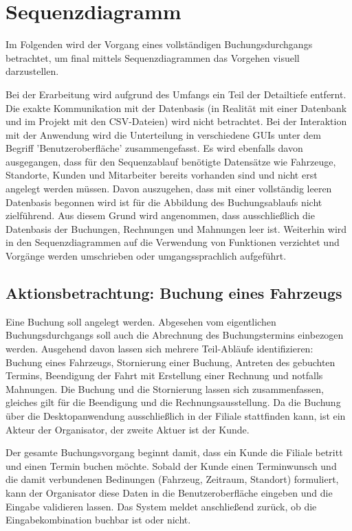 \chapter{Sequenzdiagramm}

Im Folgenden wird der Vorgang eines vollständigen Buchungsdurchgangs betrachtet, um final mittels Sequenzdiagrammen das Vorgehen visuell darzustellen. 

Bei der Erarbeitung wird aufgrund des Umfangs ein Teil der Detailtiefe entfernt. Die exakte Kommunikation mit der Datenbasis (in Realität mit einer Datenbank und im Projekt mit den CSV-Dateien) wird nicht betrachtet. Bei der Interaktion mit der Anwendung wird die Unterteilung in verschiedene GUIs unter dem Begriff 'Benutzeroberfläche' zusammengefasst. Es wird ebenfalls davon ausgegangen, dass für den Sequenzablauf benötigte Datensätze wie Fahrzeuge, Standorte, Kunden und Mitarbeiter bereits vorhanden sind und nicht erst angelegt werden müssen. Davon auszugehen, dass mit einer vollständig leeren Datenbasis begonnen wird ist für die Abbildung des Buchungsablaufs nicht zielführend. Aus diesem Grund wird angenommen, dass ausschließlich die Datenbasis der Buchungen, Rechnungen und Mahnungen leer ist. Weiterhin wird in den Sequenzdiagrammen auf die Verwendung von Funktionen verzichtet und Vorgänge werden umschrieben oder umgangssprachlich aufgeführt. 

\section{Aktionsbetrachtung: Buchung eines Fahrzeugs}

Eine Buchung soll angelegt werden. Abgesehen vom eigentlichen Buchungsdurchgangs soll auch die Abrechnung des Buchungstermins einbezogen werden. Ausgehend davon lassen sich mehrere Teil-Abläufe identifizieren: Buchung eines Fahrzeugs, Stornierung einer Buchung, Antreten des gebuchten Termins, Beendigung der Fahrt mit Erstellung einer Rechnung und notfalls Mahnungen. Die Buchung und die Stornierung lassen sich zusammenfassen, gleiches gilt für die Beendigung und die Rechnungsausstellung. Da die Buchung über die Desktopanwendung ausschließlich in der Filiale stattfinden kann, ist ein Akteur der Organisator, der zweite Aktuer ist der Kunde.


Der gesamte Buchungsvorgang beginnt damit, dass ein Kunde die Filiale betritt und einen Termin buchen möchte. Sobald der Kunde einen Terminwunsch und die damit verbundenen Bedinungen (Fahrzeug, Zeitraum, Standort) formuliert, kann der Organisator diese Daten in die Benutzeroberfläche eingeben und die Eingabe validieren lassen. Das System meldet anschließend zurück, ob die Eingabekombination buchbar ist oder nicht. 


